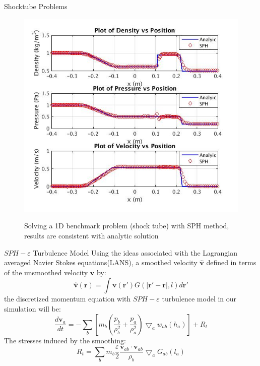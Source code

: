 \documentclass[final]{beamer}
\newlength{\onecolwid}
\begin{document}
\begin{frame}[t]
\begin{columns}[t]
\begin{column}{\onecolwid}
\begin{block}{Shocktube Problems}
\begin{figure}
\centering
{\includegraphics[height= 0.650\linewidth]{shocktube}}
\caption{Solving  a 1D benchmark problem (shock tube) with SPH method, results are consistent with analytic solution}
\label{fig:effect_of_turbulence}
\end{figure}
\end{block}


\begin{block}{ $SPH-\varepsilon$ Turbulence Model \cite{monaghan2011turbulence}}
Using the ideas associated with the Lagrangian averaged Navier Stokes equations(LANS), a smoothed velocity $\widehat{\textbf{v}}$ 
defined in terms of the unsmoothed velocity $\textbf{v}$ by:
\begin{equation}
\widehat{\textbf{v}}(\textbf{r})=\int \textbf{v}(\textbf{r} \prime)G(\vert \textbf{r} \prime - \textbf{r} \vert, l) d\textbf{r} \prime
\end{equation}
the discretized momentum equation with $SPH-\varepsilon$ turbulence model in our simulation will be:
\begin{equation}
\label{eq:SPH-mom-epsilon-turb}
\dfrac{d \textbf{v}_a}{dt} = -\sum_b [m_b (\dfrac{p_b}{\rho_b^2} + \dfrac{p_a}{\rho_a^2}) \bigtriangledown_aw_{a b}(h_a)] + R_t
\end{equation}
The stresses induced by the smoothing:
\begin{equation}
R_t=\sum_b m_b \dfrac{\varepsilon}{2} \dfrac{\textbf{v}_{ab} \cdot \textbf{v}_{ab}}{\rho_b} \bigtriangledown_aG_{ab}(l_a)
\end{equation}
 

\end{block}
\end{column}
\end{columns}
\end{frame}
\end{document}
